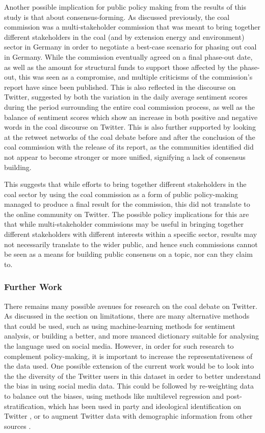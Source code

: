 \documentclass[12pt,onecolumn,twoside]{layout}
\begin{document}
Another possible implication for public policy making from the results of this study is that about consensus-forming. As discussed previously, the coal commission was a multi-stakeholder commission that was meant to bring together different stakeholders in the coal (and by extension energy and environment) sector in Germany in order to negotiate a best-case scenario for phasing out coal in Germany. While the commission eventually agreed on a final phase-out date, as well as the amount for structural funds to support those affected by the phase-out, this was seen as a compromise, and multiple criticisms of the commission's report have since been published. This is also reflected in the discourse on Twitter, suggested by both the variation in the daily average sentiment scores during the period surrounding the entire coal commission process, as well as the balance of sentiment scores which show an increase in both positive and negative words in the coal discourse on Twitter. This is also further supported by looking at the retweet networks of the coal debate before and after the conclusion of the coal commission with the release of its report, as the communities identified did not appear to become stronger or more unified, signifying a lack of consensus building. 

This suggests that while efforts to bring together different stakeholders in the coal sector by using the coal commission as a form of public policy-making managed to produce a final result for the commission, this did not translate to the online community on Twitter. The possible policy implications for this are that while multi-stakeholder commissions may be useful in bringing together different stakeholders with different interests within a specific sector, results may not necessarily translate to the wider public, and hence such commissions cannot be seen as a means for building public consensus on a topic, nor can they claim to.   

\subsubsection*{Further Work} 
There remains many possible avenues for research on the coal debate on Twitter. As discussed in the section on limitations, there are many alternative methods that could be used, such as using machine-learning methods for sentiment analysis, or building a better, and more nuanced dictionary suitable for analysing the language used on social media. However, in order for such research to complement policy-making, it is important to increase the representativeness of the data used. One possible extension of the current work would be to look into the the diversity of the Twitter users in this dataset in order to better understand the bias in using social media data. This could be followed by re-weighting data to balance out the biases, using methods like multilevel regression and post-stratification, which has been used in party and ideological identification on Twitter \cite{Barbera2015}, or to augment Twitter data with demographic information from other sources \cite{Barbera2015a, Bode2016}. 
\end{document}
